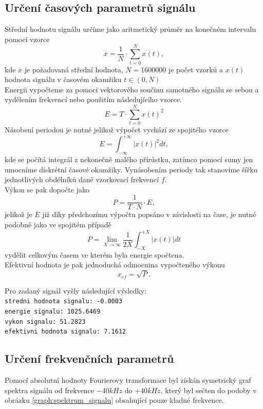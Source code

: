 \documentclass{article}
\begin{document}
		\subsection{Určení časových parametrů signálu}
			\noindent
			Střední hodnotu signálu určíme jako aritmetický průměr na konečném intervalu pomocí vzorce
			\[\overline{x} = \frac{1}{N}\cdot\sum_{t=0}^{N}x(t),\]
			kde \(\overline{x}\) je požadovaná střední hodnota, \(N=1600000\) je počet vzorků a \(x(t)\) hodnota signálu v časovém okamžiku \(t \in (0,N)\)\\
			
			\noindent
			Energii vypočteme za pomoci vektorového součinu samotného signálu se sebou a vydělením frekvencí  nebo použitím následujícího vzorce.
			\[E = T\cdot\sum_{t=0}^{N}x(t)^{2}\]
			Násobení periodou je nutné jelikož výpočet vychází ze spojitého vzorce
			\[E = \int_{-\infty}^{+\infty}|x(t)|^{2}dt,\]
			kde se počítá integrál z nekonečně malého přírůstku, zatímco pomocí sumy jen umocníme diskrétní časové okamžiky. Vynásobením periody tak stanovíme šířku jednotlivých obdélníků dané vzorkovací frekvencí \(f\).\\
			
			\noindent
			Výkon se pak dopočte jako
			\[P=\frac{1}{T\cdot N}\cdot E,\]
			jelikož je \(E\) již díky předchozímu výpočtu popsáno v závislosti na čase, je nutné podobně jako ve spojitém případě
			\[P = \lim_{X\to \infty} \frac{1}{2X} \int_{-X}^{+X}|x(t)|dt\]
			vydělit celkovým časem ve kterém byla energie spočtena.\\
			
			\noindent
			Efektivní hodnota je pak jednoduchá odmocnina vypočteného výkonu
			\[x_{ef} = \sqrt{P}.\]
			
			\noindent
			Pro zadaný signál vyšly následující výsledky:\\
			\verb|stredni hodnota signalu: -0.0003|\\
			\verb|energie signalu: 1025.6469|\\
			\verb|vykon signalu: 51.2823|\\
			\verb|efektivni hodnota signalu: 7.1612|\\
		
		\subsection{Určení frekvenčních parametrů}
			Pomocí absolutní hodnoty Fourierovy transformace byl získán symetrický graf spektra signálu od frekvence \(-40kHz\) do \(+40kHz\), který byl sečten do podoby v obrázku \ref{graph:spektrum_signalu} obsahující pouze kladné frekvence.\\
			
\end{document}
